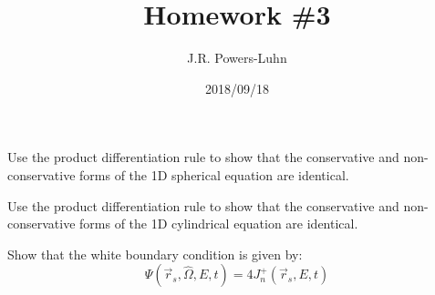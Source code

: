 \documentclass{hw}
\author{J.R. Powers-Luhn}
\date{2018/09/18}
\title{Homework \#3}
\begin{document}
\problem{}
    Use the product differentiation rule to show that the conservative and non-conservative forms of the 1D spherical equation are identical.

\solution
    

\problem{}
    Use the product differentiation rule to show that the conservative and non-conservative forms of the 1D cylindrical equation are identical.

\solution
    

\problem{}
    Show that the white boundary condition is given by: $$ \Psi(\vec{r}_s, \hat{\Omega}, E, t) = 4 J^+_n(\vec{r}_s, E, t) $$

\solution
    
\end{document}
